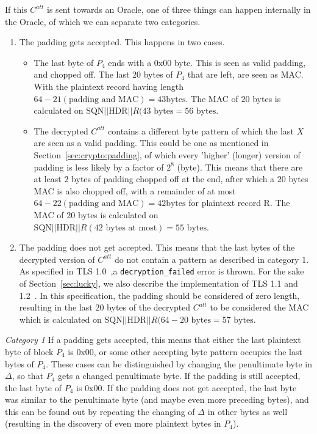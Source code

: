 \documentclass[10pt,conference,a4paper]{IEEEtran}
\begin{document}
If this $C^{att}$ is sent towards an Oracle, one of three things can happen internally in the Oracle, of which we can separate two categories.
\begin{enumerate}
  \item The padding gets accepted. This happens in two cases.
	\begin{itemize}
		\item The last byte of $P_4$ ends with a $0\text{x}00$ byte. This is seen as valid padding, and chopped off. The last $20$ bytes of $P_4$ that are left, are seen as MAC. With the plaintext record having length $64 - 21 (\text{padding and MAC}) = 43 \text{bytes}$. The MAC of $20$ bytes is calculated on $\text{SQN} || \text{HDR} || R (43 \text{ bytes} = 56\text{ bytes}$.
		\item The decrypted $C^{att}$ contains a different byte pattern of which the last $X$ are seen as a valid padding. This could be one as mentioned in Section~\ref{sec:crypto:padding}, of which every 'higher' (longer) version of padding is less likely by a factor of $2^8$ (byte). This means that there are at least $2$ bytes of padding chopped off at the end, after which a $20$ bytes MAC is also chopped off, with a remainder of at most $64 - 22 (\text{padding and MAC}) = 42 \text{bytes}$ for plaintext record R. The MAC of $20$ bytes is calculated on $\text{SQN} || \text{HDR} || R (42 \text{ bytes at most}) = 55\text{ bytes}$.
	\end{itemize}
  \item The padding does not get accepted. This means that the last bytes of the decrypted version of $C^{att}$ do not contain a pattern as described in category 1. As specified in TLS 1.0~\cite{dierks1999rfc},a \texttt{decryption\_failed} error is thrown. For the sake of Section~\ref{sec:lucky}, we also describe the implementation of TLS 1.1 and 1.2~\cite{ietf2008transport}. In this specification, the padding should be considered of zero length, resulting in the last $20$ bytes of the decrypted $C^{att}$ to be considered the MAC which is calculated on $\text{SQN} || \text{HDR} || R (64 - 20 \text{ bytes} = 57\text{ bytes}$.
\end{enumerate}

\textit{Category 1} If a padding gets accepted, this means that either the last plaintext byte of block $P_4$ is $0\text{x}00$, or some other accepting byte pattern occupies the last bytes of $P_4$. These cases can be distinguished by changing the penultimate byte in $\Delta$, so that $P_4$ gets a changed penultimate byte. If the padding is still accepted, the last byte of $P_4$ is $0\text{x}00$. If the padding does not get accepted, the last byte was similar to the penultimate byte (and maybe even more preceding bytes), and this can be found out by repeating the changing of $\Delta$ in other bytes as well (resulting in the discovery of even more plaintext bytes in $P_4$).
\end{document}

